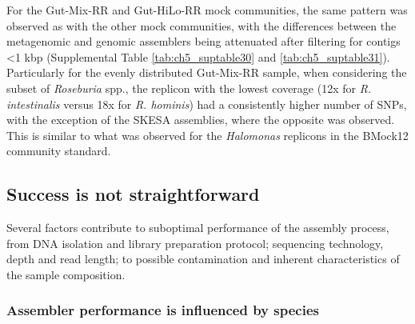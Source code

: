 For the Gut-Mix-RR and Gut-HiLo-RR mock communities, the same pattern was observed as with the other mock communities, with the differences between the metagenomic and genomic assemblers being attenuated after filtering for contigs <1 kbp (Supplemental Table \ref{tab:ch5_suptable30} and \ref{tab:ch5_suptable31}). Particularly for the evenly distributed Gut-Mix-RR sample, when considering the subset of \textit{Roseburia} spp., the replicon with the lowest coverage (12x for \textit{R. intestinalis} versus 18x for \textit{R. hominis}) had a consistently higher number of SNPs, with the exception of the SKESA assemblies, where the opposite was observed. This is similar to what was observed for the \textit{Halomonas} replicons in the BMock12 community standard.

\subsection{Success is not straightforward}

Several factors contribute to suboptimal performance of the assembly process, from DNA isolation and library preparation protocol; sequencing technology, depth and read length; to possible contamination and inherent characteristics of the sample composition.

\subsubsection{Assembler performance is influenced by species}

